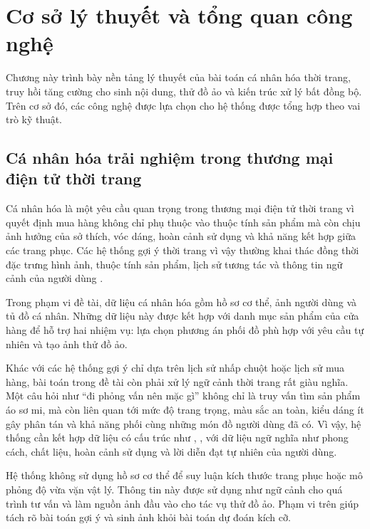 \chapter{Cơ sở lý thuyết và tổng quan công nghệ}

Chương này trình bày nền tảng lý thuyết của bài toán cá nhân hóa thời trang, truy hồi tăng cường cho sinh nội dung, thử đồ ảo và kiến trúc xử lý bất đồng bộ. Trên cơ sở đó, các công nghệ được lựa chọn cho hệ thống được tổng hợp theo vai trò kỹ thuật.

\medskip

\section{Cá nhân hóa trải nghiệm trong thương mại điện tử thời trang}

Cá nhân hóa là một yêu cầu quan trọng trong thương mại điện tử thời trang vì quyết định mua hàng không chỉ phụ thuộc vào thuộc tính sản phẩm mà còn chịu ảnh hưởng của sở thích, vóc dáng, hoàn cảnh sử dụng và khả năng kết hợp giữa các trang phục. Các hệ thống gợi ý thời trang vì vậy thường khai thác đồng thời đặc trưng hình ảnh, thuộc tính sản phẩm, lịch sử tương tác và thông tin ngữ cảnh của người dùng \cite{fashion-review}.

\medskip

Trong phạm vi đề tài, dữ liệu cá nhân hóa gồm hồ sơ cơ thể, ảnh người dùng và tủ đồ cá nhân. Những dữ liệu này được kết hợp với danh mục sản phẩm của cửa hàng để hỗ trợ hai nhiệm vụ: lựa chọn phương án phối đồ phù hợp với yêu cầu tự nhiên và tạo ảnh thử đồ ảo.

\medskip

Khác với các hệ thống gợi ý chỉ dựa trên lịch sử nhấp chuột hoặc lịch sử mua hàng, bài toán trong đề tài còn phải xử lý ngữ cảnh thời trang rất giàu nghĩa. Một câu hỏi như ``đi phỏng vấn nên mặc gì'' không chỉ là truy vấn tìm sản phẩm áo sơ mi, mà còn liên quan tới mức độ trang trọng, màu sắc an toàn, kiểu dáng ít gây phân tán và khả năng phối cùng những món đồ người dùng đã có. Vì vậy, hệ thống cần kết hợp dữ liệu có cấu trúc như , ,  với dữ liệu ngữ nghĩa như phong cách, chất liệu, hoàn cảnh sử dụng và lời diễn đạt tự nhiên của người dùng.

\medskip

Hệ thống không sử dụng hồ sơ cơ thể để suy luận kích thước trang phục hoặc mô phỏng độ vừa vặn vật lý. Thông tin này được sử dụng như ngữ cảnh cho quá trình tư vấn và làm nguồn ảnh đầu vào cho tác vụ thử đồ ảo. Phạm vi trên giúp tách rõ bài toán gợi ý và sinh ảnh khỏi bài toán dự đoán kích cỡ.

